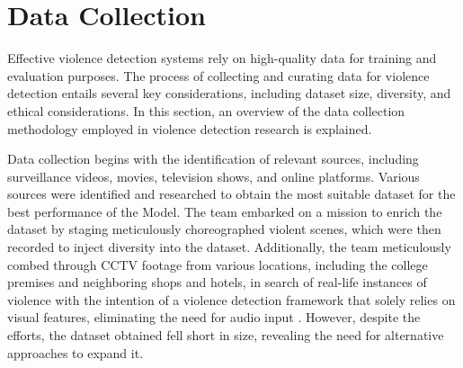 

\section{Data Collection}

\noindent Effective violence detection systems rely on high-quality data for training and evaluation purposes. The process of collecting and curating data for violence detection entails several key considerations, including dataset size, diversity, and ethical considerations. In this section, an overview of the data collection methodology employed in violence detection research is explained.

\noindent Data collection begins with the identification of relevant sources, including surveillance videos, movies, television shows, and online platforms. Various sources were identified and researched to obtain the most suitable dataset for the best performance of the Model. The team embarked on a mission to enrich the dataset by staging meticulously choreographed violent scenes\cite{Recorded_violence}, which were then recorded to inject diversity into the dataset. Additionally, the team meticulously combed through CCTV footage\cite{Violent_flows} from various locations, including the college premises and neighboring shops and hotels, in search of real-life instances of violence with the intention of a violence detection framework that solely relies on visual features, eliminating the need for audio input \cite{audio_visual}\cite{ourdataset}. However, despite the efforts, the dataset obtained fell short in size, revealing the need for alternative approaches to expand it.

